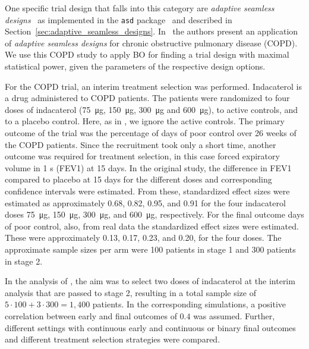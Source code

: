 \documentclass[bimj,fleqn]{w-art}
\theoremstyle{plain}
\theoremstyle{definition}
\begin{document}
One specific trial design that falls into this category are \emph{adaptive seamless designs}~\citep{barnes_integrating_2010} as implemented in the \texttt{asd} package~\citep{parsons_software_2011} and described in Section~\ref{sec:adaptive_seamless_designs}.
In~\citet{friede_adaptive_2020} the authors present an application of \emph{adaptive seamless designs} for chronic obstructive pulmonary disease (COPD).
We use this COPD study to apply BO for finding a trial design with maximal statistical power, given the parameters of the respective design options.


For the COPD trial, an interim treatment selection was performed. 
Indacaterol is a drug administered to COPD patients.
The patients were randomized to four doses of indacaterol (\SI{75}{\micro\gram}, \SI{150}{\micro\gram}, \SI{300}{\micro\gram} and \SI{600}{\micro\gram}), to active controls, and to a placebo control.
Here, as in \citet{friede_adaptive_2020}, we ignore the active controls.
The primary outcome of the trial was the percentage of days of poor control over 26 weeks of the COPD patients.
Since the recruitment took only a short time, another outcome was required for treatment selection, in this case forced expiratory volume in 1 s (FEV1) at 15 days.
In the original study, the difference in FEV1 compared to placebo at 15 days for the different doses and corresponding confidence intervals were estimated.
From these, standardized effect sizes were estimated as approximately 0.68, 0.82, 0.95, and 0.91 for the four indacaterol doses \SI{75}{\micro\gram}, \SI{150}{\micro\gram}, \SI{300}{\micro\gram}, and \SI{600}{\micro\gram}, respectively.
For the final outcome days of poor control, also, from real data the standardized effect sizes were estimated.
These were approximately 0.13, 0.17, 0.23, and 0.20, for the four doses.
The approximate sample sizes per arm were 100 patients in stage 1 and 300 patients in stage 2.

In the analysis of \citet{friede_adaptive_2020}, the aim was to select two doses of indacaterol at the interim analysis that are passed to stage 2, resulting in a total sample size of $5 \cdot 100 + 3 \cdot 300 = 1,400$ patients. 
In the corresponding simulations, a positive correlation between early and final outcomes of $0.4$ was assumed.
Further, different settings with continuous early and continuous or binary final outcomes and different treatment selection strategies were compared.
\end{document}
